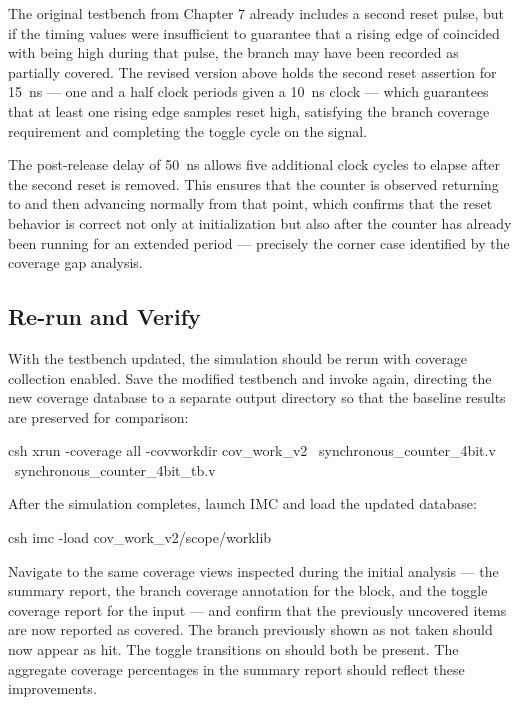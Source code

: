 The original testbench from Chapter 7 already includes a second reset pulse, but if the timing values were insufficient to guarantee that a rising edge of  coincided with  being high during that pulse, the branch may have been recorded as partially covered. The revised version above holds the second reset assertion for 15~ns — one and a half clock periods given a 10~ns clock — which guarantees that at least one rising edge samples reset high, satisfying the branch coverage requirement and completing the toggle cycle on the  signal.\

The post-release delay of 50~ns allows five additional clock cycles to elapse after the second reset is removed. This ensures that the counter is observed returning to  and then advancing normally from that point, which confirms that the reset behavior is correct not only at initialization but also after the counter has already been running for an extended period — precisely the corner case identified by the coverage gap analysis.\

\subsection{Re-run and Verify}

With the testbench updated, the simulation should be rerun with coverage collection enabled. Save the modified testbench and invoke  again, directing the new coverage database to a separate output directory so that the baseline results are preserved for comparison:

\begin{codeblock}{csh}
xrun -coverage all -covworkdir cov_work_v2 \
     synchronous_counter_4bit.v \
     synchronous_counter_4bit_tb.v
\end{codeblock}

After the simulation completes, launch IMC and load the updated database:

\begin{codeblock}{csh}
imc -load cov_work_v2/scope/worklib
\end{codeblock}

Navigate to the same coverage views inspected during the initial analysis — the summary report, the branch coverage annotation for the  block, and the toggle coverage report for the  input — and confirm that the previously uncovered items are now reported as covered. The branch previously shown as not taken should now appear as hit. The toggle transitions on  should both be present. The aggregate coverage percentages in the summary report should reflect these improvements.


